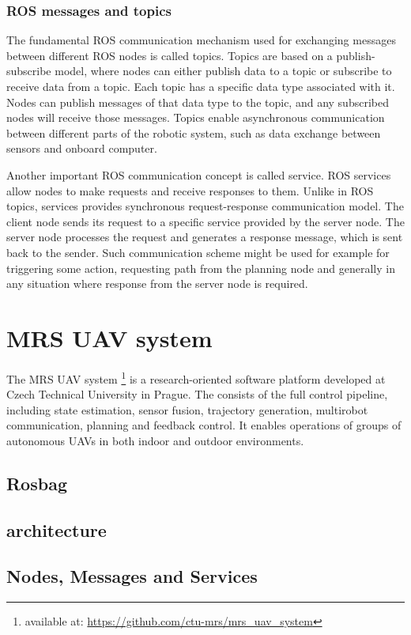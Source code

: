\subsubsection{ROS messages and topics}
The fundamental \ac{ROS} communication mechanism used for exchanging messages between different \ac{ROS} nodes is called topics.
Topics are based on a publish-subscribe model, where nodes can either publish data to a topic or subscribe to receive data from a topic. 
Each topic has a specific data type associated with it.
Nodes can publish messages of that data type to the topic, and any subscribed nodes will receive those messages.
Topics enable asynchronous communication between different parts of the robotic system, such as data exchange between sensors and onboard computer.

Another important \ac{ROS} communication concept is called service.
\ac{ROS} services allow nodes to make requests and receive responses to them.
Unlike in \ac{ROS} topics, services provides synchronous request-response communication model.
The client node sends its request to a specific service provided by the server node.
The server node processes the request and generates a response message, which is sent back to the sender.
Such communication scheme might be used for example for triggering some action, requesting path from the planning node and generally in any situation where response from the server node is required.

\section{MRS UAV system}
The MRS UAV system \footnote{available at: \url{https://github.com/ctu-mrs/mrs_uav_system}} \cite{mrs_system} is a research-oriented software platform developed at Czech Technical University in Prague.
The consists of the full control pipeline, including state estimation, sensor fusion, trajectory generation, multirobot communication, planning and feedback control.
It enables operations of groups of autonomous \ac{UAV}s in both indoor and outdoor environments.

    
\subsection{Rosbag}
\subsection{architecture}
\subsection{Nodes, Messages and Services}

